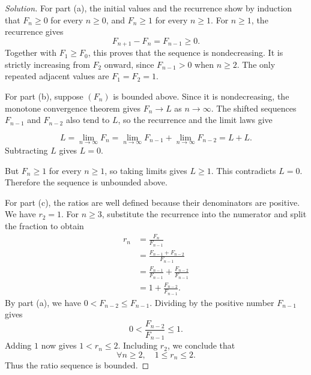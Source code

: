 \begin{proof}[Solution]
  For part (a), the initial values and the recurrence show by induction
  that $F_n\geq0$ for every $n\geq0$, and $F_n\geq1$ for every
  $n\geq1$. For $n\geq1$, the recurrence gives
  \[
    F_{n+1}-F_n=F_{n-1}\geq0.
  \]
  Together with $F_1\geq F_0$, this proves that the sequence is
  nondecreasing. It is strictly increasing from $F_2$ onward, since
  $F_{n-1}>0$ when $n\geq2$. The only repeated adjacent values are
  $F_1=F_2=1$.


  For part (b), suppose $(F_n)$ is bounded above. Since it is nondecreasing,
  the monotone convergence theorem gives $F_n\to L$ as $n\to\infty$.
  The shifted sequences $F_{n-1}$ and $F_{n-2}$ also tend to $L$, so the
  recurrence and the limit laws give

  \[
    L=\lim_{n\to\infty}F_n
      =\lim_{n\to\infty}F_{n-1}+\lim_{n\to\infty}F_{n-2}
      =L+L.
  \]
  Subtracting $L$ gives $L=0$.

  But $F_n\geq1$ for every $n\geq1$, so taking limits gives $L\geq1$.
  This contradicts $L=0$. Therefore the sequence is unbounded above.

  For part (c), the ratios are well defined because their denominators
  are positive. We have $r_2=1$. For $n\geq3$, substitute the recurrence
  into the numerator and split the fraction to obtain
  \begin{align*}
    r_n&=\frac{F_n}{F_{n-1}}\\
       &=\frac{F_{n-1}+F_{n-2}}{F_{n-1}}\\
       &=\frac{F_{n-1}}{F_{n-1}}+\frac{F_{n-2}}{F_{n-1}}\\
       &=1+\frac{F_{n-2}}{F_{n-1}}.
  \end{align*}
  By part (a), we have $0<F_{n-2}\leq F_{n-1}$. Dividing by the
  positive number $F_{n-1}$ gives
  \[
    0<\frac{F_{n-2}}{F_{n-1}}\leq1.
  \]
  Adding $1$ now gives $1<r_n\leq2$.
  Including $r_2$, we conclude that
  \[
    \forall n\geq2,\quad 1\leq r_n\leq2.
  \]
  Thus the ratio sequence is bounded.


\end{proof}
